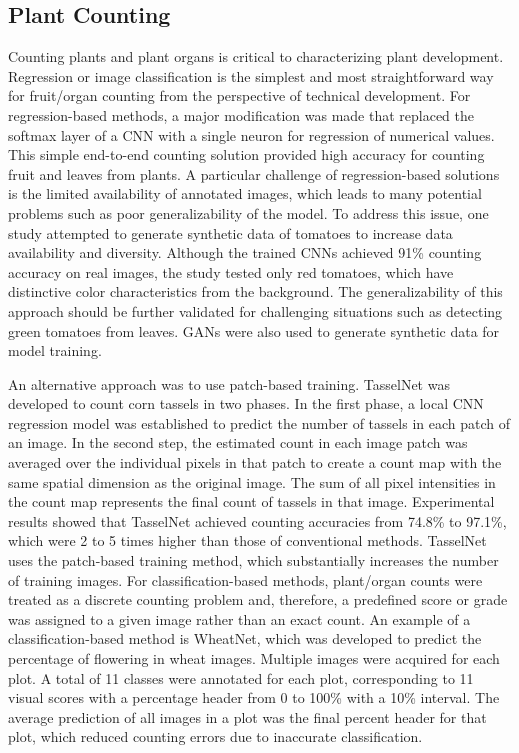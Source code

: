 \subsection{Plant Counting}
Counting plants and plant organs is critical to characterizing plant development.
Regression or image classification is the simplest and most straightforward way for fruit/organ counting from the perspective of technical development.
For regression-based methods, a major modification was made that replaced the softmax layer of a CNN with a single neuron for regression of numerical values.
This simple end-to-end counting solution provided high accuracy for counting fruit and leaves from plants. A particular challenge of regression-based solutions
is the limited availability of annotated images, which leads to many potential problems such as poor generalizability of the model. To address this issue,
one study attempted to generate synthetic data of tomatoes to increase data availability and diversity. Although the trained CNNs achieved 91\%
counting accuracy on real images, the study tested only red tomatoes, which have distinctive color characteristics from the background. The generalizability
of this approach should be further validated for challenging situations such as detecting green tomatoes from leaves. GANs were also used to generate synthetic
data for model training.

An alternative approach was to use patch-based training. TasselNet was developed to count corn tassels in two phases. In the first phase,
a local CNN regression model was established to predict the number of tassels in each patch of an image. In the second step, the estimated count in each image patch
was averaged over the individual pixels in that patch to create a count map with the same spatial dimension as the original image. The sum of all pixel intensities
in the count map represents the final count of tassels in that image. Experimental results showed that TasselNet achieved counting accuracies from 74.8\% to 97.1\%,
which were 2 to 5 times higher than those of conventional methods. TasselNet uses the patch-based training method, which substantially increases the number of
training images. For classification-based methods, plant/organ counts were treated as a discrete counting problem and, therefore, a predefined score or grade was
assigned to a given image rather than an exact count. An example of a classification-based method is WheatNet, which was developed to predict the percentage of
flowering in wheat images. Multiple images were acquired for each plot. A total of 11 classes were annotated for each plot, corresponding to 11 visual scores with
a percentage header from 0 to 100\% with a 10\% interval. The average prediction of all images in a plot was the final percent header for that plot, which reduced
counting errors due to inaccurate classification.

